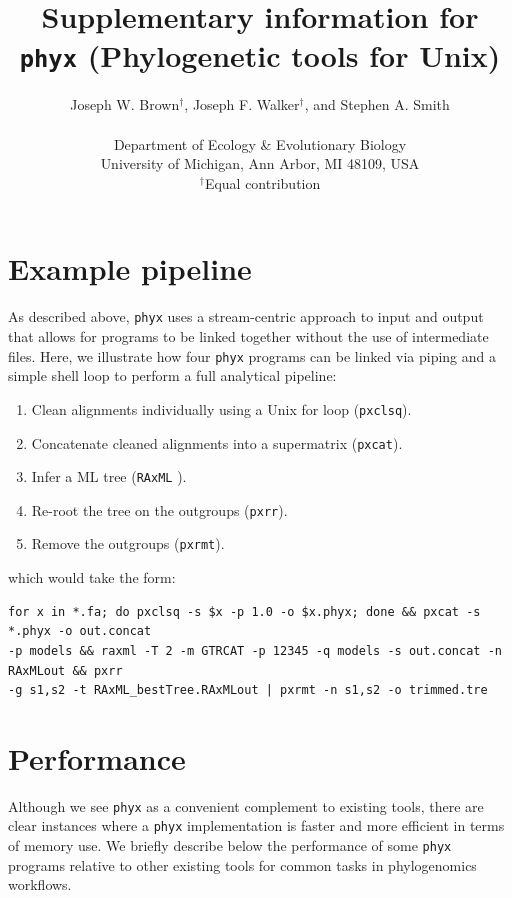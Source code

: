 \documentclass{article}
\begin{document}
\title{Supplementary information for \texttt{phyx} (Phylogenetic tools for Unix)}

\author{Joseph W. Brown$^{\dagger}$, Joseph F. Walker$^{\dagger}$, and Stephen A. Smith\\\\
\normalsize{Department of Ecology \& Evolutionary Biology}\\
\normalsize{University of Michigan, Ann Arbor, MI 48109, USA}\\
\normalsize{$^{\dagger}$Equal contribution}}
\date{} %
\maketitle

\section{Example pipeline}
As described above, \texttt{phyx} uses a stream-centric approach to input and output that allows for programs to be linked together without the use of intermediate files. Here, we illustrate how four \texttt{phyx} programs can be linked via piping
and a simple shell loop to perform a full analytical pipeline:
\begin{enumerate}
\item Clean alignments individually using a Unix for loop (\texttt{pxclsq}).
\item Concatenate cleaned alignments into a supermatrix (\texttt{pxcat}).
\item Infer a ML tree (\texttt{RAxML} \citep{Stamatakis2014}).
\item Re-root the tree on the outgroups (\texttt{pxrr}).
\item Remove the outgroups (\texttt{pxrmt}).
\end{enumerate}
which would take the form:

\begin{verbatim}
for x in *.fa; do pxclsq -s $x -p 1.0 -o $x.phyx; done && pxcat -s *.phyx -o out.concat
-p models && raxml -T 2 -m GTRCAT -p 12345 -q models -s out.concat -n RAxMLout && pxrr
-g s1,s2 -t RAxML_bestTree.RAxMLout | pxrmt -n s1,s2 -o trimmed.tre
\end{verbatim}

\section{Performance}
Although we see \texttt{phyx} as a convenient complement to existing tools, there are clear instances where a \texttt{phyx} implementation is faster and more efficient in terms of memory use. We briefly describe below the performance of some \texttt{phyx} programs relative to other existing tools for common tasks in phylogenomics workflows.
\end{document}
